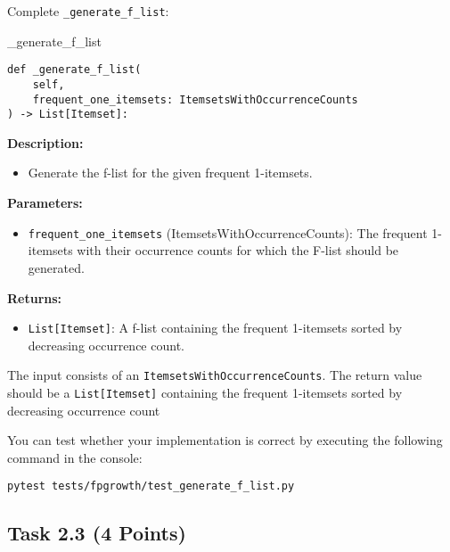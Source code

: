 \documentclass[
english,
smallborders
]{i6prcsht}
\newcommand{\points}[1]{\hfill \color{red}(#1 Points)\color{black}}
\begin{document}
Complete \texttt{\_generate\_f\_list}:

\vspace*{0.3cm}

\begin{functionbox}{\_generate\_f\_list}
	\begin{lstlisting}[numbers=none]
def _generate_f_list(
    self, 
    frequent_one_itemsets: ItemsetsWithOccurrenceCounts
) -> List[Itemset]:
\end{lstlisting}
	
	\textbf{Description:}
	\begin{itemize}[leftmargin=*,topsep=0pt]
		\item Generate the f-list for the given frequent 1-itemsets.
	\end{itemize}
	
	\textbf{Parameters:}
	\begin{itemize}[leftmargin=*,topsep=0pt]
		\item \texttt{frequent\_one\_itemsets} (ItemsetsWithOccurrenceCounts): The frequent 1-itemsets with their occurrence counts for which the F-list should be generated.
	\end{itemize}
	
	\textbf{Returns:}
	\begin{itemize}[leftmargin=*,topsep=0pt]
		\item \texttt{List[Itemset]}: A f-list containing the frequent 1-itemsets sorted by decreasing occurrence count.
	\end{itemize}
\end{functionbox}

\vspace*{0.5cm}

The input consists of an \texttt{ItemsetsWithOccurrenceCounts}. The return value should be a \texttt{List[Itemset]} containing the frequent 1-itemsets sorted by decreasing occurrence count

You can test whether your implementation is correct by executing the following command in the console:

\vspace*{0.3cm}

\begin{lstlisting}
pytest tests/fpgrowth/test_generate_f_list.py
\end{lstlisting}

\newpage

\subsection*{Task 2.3 \points{4}}
\end{document}
